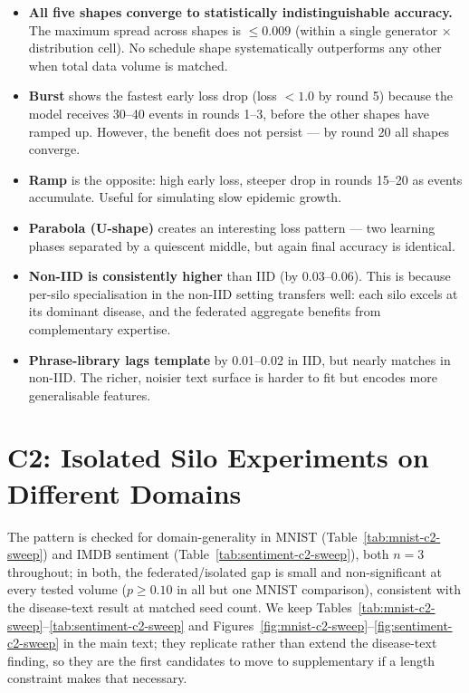 \documentclass[utf8]{frontiers_suppmat} %
\begin{document}
\begin{itemize}
  \item \textbf{All five shapes converge to statistically indistinguishable
  accuracy.} The maximum spread across shapes is $\leq 0.009$ (within a
  single generator $\times$ distribution cell). No schedule shape
  systematically outperforms any other when total data volume is matched.
  \item \textbf{Burst} shows the fastest early loss drop (loss $< 1.0$ by
  round 5) because the model receives 30--40 events in rounds 1--3, before
  the other shapes have ramped up. However, the benefit does not persist
  --- by round 20 all shapes converge.
  \item \textbf{Ramp} is the opposite: high early loss, steeper drop in
  rounds 15--20 as events accumulate. Useful for simulating slow epidemic
  growth.
  \item \textbf{Parabola (U-shape)} creates an interesting loss pattern ---
  two learning phases separated by a quiescent middle, but again final
  accuracy is identical.
  \item \textbf{Non-IID is consistently higher} than IID (by 0.03--0.06).
  This is because per-silo specialisation in the non-IID setting transfers
  well: each silo excels at its dominant disease, and the federated
  aggregate benefits from complementary expertise.
  \item \textbf{Phrase-library lags template} by 0.01--0.02 in IID, but
  nearly matches in non-IID. The richer, noisier text surface is harder to
  fit but encodes more generalisable features.
\end{itemize}

\section{C2: Isolated Silo Experiments on Different Domains}
\label{sec:supp-c2-domains}

The pattern is checked for domain-generality in MNIST
(Table~\ref{tab:mnist-c2-sweep}) and IMDB sentiment
(Table~\ref{tab:sentiment-c2-sweep}), both $n=3$ throughout; in both,
the federated/isolated gap is small and non-significant at every tested
volume ($p\geq 0.10$ in all but one MNIST comparison), consistent with
the disease-text result at matched seed count. We keep
Tables~\ref{tab:mnist-c2-sweep}--\ref{tab:sentiment-c2-sweep} and
Figures~\ref{fig:mnist-c2-sweep}--\ref{fig:sentiment-c2-sweep} in the
main text; they replicate rather than extend the disease-text finding,
so they are the first candidates to move to supplementary if a length
constraint makes that necessary.
\end{document}
